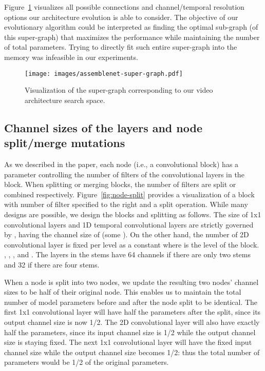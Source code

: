 \documentclass{article} \usepackage{iclr2020_conference,times}
\begin{document}
Figure~\ref{fig:super-graph} visualizes all possible connections and channel/temporal resolution options our architecture evolution is able to consider. The objective of our evolutionary algorithm could be interpreted as finding the optimal sub-graph (of this super-graph) that maximizes the performance while maintaining the number of total parameters. Trying to directly fit such entire super-graph into the memory was infeasible in our experiments.

\begin{figure}[h]
  \centering
   \texttt{[image: images/assemblenet-super-graph.pdf]}
  \caption{Visualization of the super-graph corresponding to our video architecture search space.}
  \label{fig:super-graph}
\end{figure}

\subsection{Channel sizes of the layers and node split/merge mutations}

As we described in the paper, each node (i.e., a convolutional block) has a parameter  controlling the number of filters of the convolutional layers in the block. When splitting or merging blocks, the number of filters are split or combined respectively. Figure~\ref{fig:node-split} provides a visualization of a block with number of filter specified to the right and a split operation. While many designs are possible, we design the blocks and splitting as follows. The size of 1x1 convolutional layers and 1D temporal convolutional layers are strictly governed by , having the channel size of  (some ). On the other hand, the number of 2D convolutional layer is fixed per level as a constant  where  is the level of the block. , , , and . The layers in the stems have 64 channels if there are only two stems and 32 if there are four stems.

When a node is split into two nodes, we update the resulting two nodes' channel sizes to be half of their original node. This enables us to maintain the total number of model parameters before and after the node split to be identical. The first 1x1 convolutional layer will have half the parameters after the split, since its output channel size is now 1/2. The 2D convolutional layer will also have exactly half the parameters, since its input channel size is 1/2 while the output channel size is staying fixed. The next 1x1 convolutional layer will have the fixed input channel size while the output channel size becomes 1/2: thus the total number of parameters would be 1/2 of the original parameters. 
\end{document}
